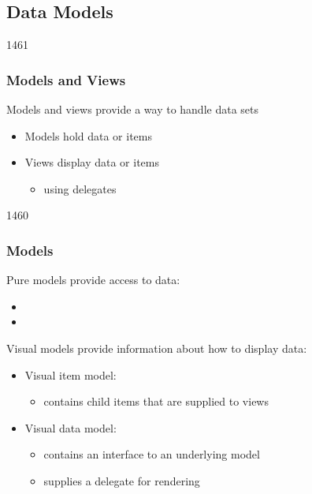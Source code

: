 %
%
%
%

\subsection{Data Models}


\begin{slide}{1461}\frametitle{Models and Views}


Models and views provide a way to handle data sets

\begin{itemize}
\item Models hold data or items
\item Views display data or items
  \begin{itemize}
  \item using delegates
  \end{itemize}
\end{itemize}

\end{slide}


\begin{slide}{1460}\frametitle{Models}

Pure models provide access to data:

\begin{itemize}
\item {}
\item {}
\end{itemize}

Visual models provide information about how to display data:

\begin{itemize}
\item Visual item model: 
  \begin{itemize}
  \item contains child items that are supplied to views
  \end{itemize}
\item Visual data model: 
  \begin{itemize}
  \item contains an interface to an underlying model
  \item supplies a delegate for rendering
  \end{itemize}
\end{itemize}

\end{slide}

